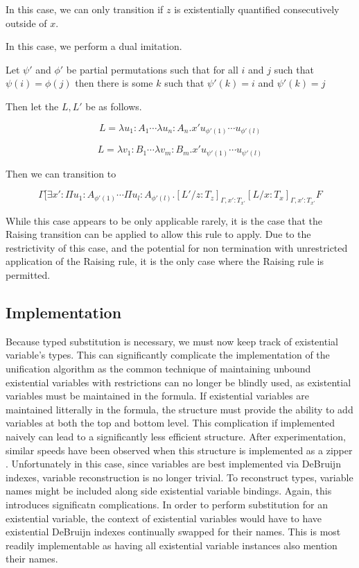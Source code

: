In this case, we can only transition if $z$ is existentially 
quantified consecutively outside of $x$.

In this case, we perform a dual imitation.

Let $\psi'$ and $\phi'$ be partial permutations 
such that for all $i$ and $j$ such that
$\psi(i) = \phi(j)$ then there is some $k$ such that
$\psi'(k) = i$ and $\psi'(k) = j$

Then let the $L,L'$ be as follows.

\[
L = \lambda u_1 : A_1 \cdots \lambda u_n : A_n . x' u_{\phi'(1)} \cdots u_{\phi'(l)}
\]

\[
L = \lambda v_1 : B_1 \cdots \lambda v_m : B_m . x' u_{\psi'(1)} \cdots u_{\psi'(l)}
\]

Then we can transition to

\[
\Gamma [ \exists x' : \Pi u_1 : A_{\phi'(1) } \cdots \Pi u_l : A_{\phi'(l)}
. [L'/z : T_z]_{\Gamma, x': T_{x'}}[L / x : T_x]_{\Gamma, x': T_{x'}} F
\]
 
While this case appears to be only applicable rarely,
it is the case that the Raising transition can be applied to allow this
rule to apply.  
Due to the restrictivity of this case, and the potential
for non termination with unrestricted application of the Raising rule,
it is the only case where the Raising rule is permitted.  


\subsection{Implementation}

Because typed substitution is necessary, we must now keep track of existential variable's
types.  This can significantly complicate the implementation of the unification algorithm
as the common technique of maintaining unbound existential variables with restrictions
can no longer be blindly used, as existential variables must be maintained in the 
formula.  If existential variables are maintained litterally in the formula, 
the structure must provide the ability to add variables at both the top and bottom level.
This complication if implemented naively can lead to a significantly less efficient structure.
After experimentation, similar speeds have been observed when this structure is implemented
as a zipper \citep{huet1997functional}.  Unfortunately in this case, since variables are best 
implemented via DeBruijn indexes, variable reconstruction is no longer trivial. 
To reconstruct types, variable names might be included along side existential variable bindings.  
Again, this introduces significatn complications.  In order to perform 
substitution for an existential variable, the context of existential variables would have to have
existential DeBruijn indexes continually swapped for their names.  
This is most readily implementable as having all existential variable instances 
also mention their names.

